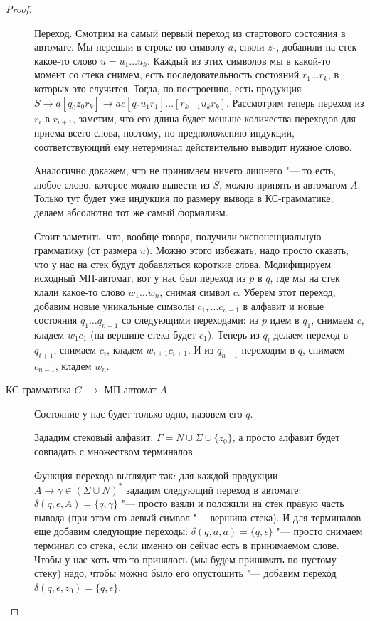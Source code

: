 \begin{proof}
\begin{description}
    Переход. Смотрим на самый первый переход из стартового состояния в автомате. 
    Мы перешли в строке по символу $a$, сняли $z_0$, добавили на стек какое-то слово $u=u_1\dots u_k$.
    Каждый из этих символов мы в какой-то момент со стека снимем, есть последовательность состояний $r_1 \dots r_k$, в которых это случится. 
    Тогда, по построению, есть продукция $S \to a [q_0 z_0 r_k] \to a c [q_0 u_1 r_1] \dots [r_{k-1} u_k r_k]$. 
    Рассмотрим теперь переход из $r_i$ в $r_{i+1}$, заметим, что его длина будет меньше количества переходов для приема всего слова, поэтому, по предположению индукции, 
    соответствующий ему нетерминал действительно выводит нужное слово.

    Аналогично докажем, что не принимаем ничего лишнего "--- то есть, любое слово, которое можно вывести из $S$, можно принять и автоматом $A$. 
    Только тут будет уже индукция по размеру вывода в КС-грамматике, делаем абсолютно тот же самый формализм.

    Стоит заметить, что, вообще говоря, получили экспоненциальную грамматику (от размера $u$). 
    Можно этого избежать, надо просто сказать, что у нас на стек будут добавляться короткие слова. 
    Модифицируем исходный МП-автомат, вот у нас был переход из $p$ в $q$, где мы на стек клали какое-то слово $w_1 \dots w_n$, снимая символ $c$. 
    Уберем этот переход, добавим новые уникальные символы $c_1, \dots c_{n-1}$ в алфавит и новые состояния $q_1 \dots q_{n-1}$ со следующими переходами:
    из $p$ идем в $q_1$, снимаем $c$, кладем $w_1c_1$ (на вершине стека будет $c_1$).
    Теперь из $q_i$ делаем переход в $q_{i+1}$, снимаем $c_i$, кладем $w_{i + 1}c_{i+1}$. 
    И из $q_{n-1}$ переходим в $q$, снимаем $c_{n-1}$, кладем $w_n$.

    \item[КС-грамматика $G$ $\to$ МП-автомат $A$]
    Состояние у нас будет только одно, назовем его $q$.

    Зададим стековый алфавит: $\Gamma = N \cup \Sigma \cup \{z_0\}$, а просто алфавит будет совпадать с множеством терминалов.

    Функция перехода выглядит так: для каждой продукции $A \to \gamma \in (\Sigma \cup N)^*$ зададим следующий переход в автомате: $\delta(q, \epsilon, A) = \{q, \gamma\}$ "---
    просто взяли и положили на стек правую часть вывода (при этом его левый символ "--- вершина стека).
    И для терминалов еще добавим следующие переходы: $\delta(q, a, a) = \{q, \epsilon\}$ "--- просто снимаем терминал со стека, если именно он сейчас есть в принимаемом слове.
    Чтобы у нас хоть что-то принялось (мы будем принимать по пустому стеку) надо, чтобы можно было его опустошить "--- добавим переход $\delta(q, \epsilon, z_0) = \{q, \epsilon\}$.


\end{description}
\end{proof}
